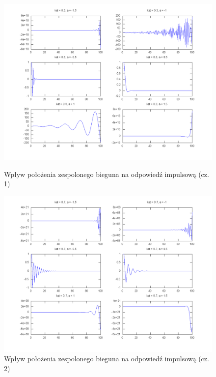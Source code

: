 \documentclass[wide,a4paper,titlepage,12pt]{mwart}
\begin{document}
  \begin{figure}[htbp]
    \begin{center}
      \includegraphics[scale=.3]{out/fig29.png}
      \caption{\label{fig29} Wpływ położenia zespolonego bieguna na odpowiedź impulsową (cz. 1)}
      \includegraphics[scale=.3]{out/fig30.png}
      \caption{\label{fig30} Wpływ położenia zespolonego bieguna na odpowiedź impulsową (cz. 2)}

    \end{center}
  \end{figure}
\end{document}
